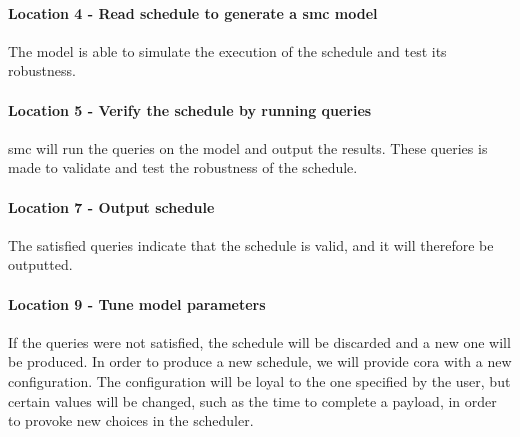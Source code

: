 \paragraph{Location 4 - Read schedule to generate a \gls{smc} model}
The model is able to simulate the execution of the schedule and test its robustness.

\paragraph{Location 5 - Verify the schedule by running queries} 
\gls{smc} will run the queries on the model and output the results.
These queries is made to validate and test the robustness of the schedule.

\paragraph{Location 7 - Output schedule} 
The satisfied queries indicate that the schedule is valid, and it will therefore be outputted.

\paragraph{Location 9 - Tune model parameters} 
If the queries were not satisfied, the schedule will be discarded and a new one will be produced.
In order to produce a new schedule, we will provide \gls{cora} with a new configuration.
The configuration will be loyal to the one specified by the user, but certain values will be changed, such as the time to complete a payload, in order to provoke new choices in the scheduler.
